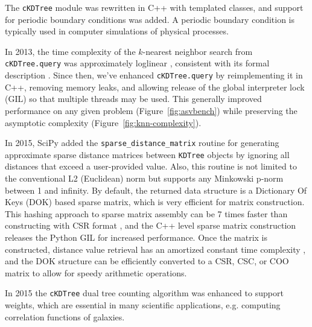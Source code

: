 The \texttt{cKDTree} module was rewritten in C++ with templated classes, and support for
periodic boundary conditions was added. A periodic boundary condition is typically 
used in computer simulations of physical processes.

In 2013, the time complexity of the $k$-nearest neighbor search from
\texttt{cKDTree.query} was approximately loglinear \cite{knn-jake},
consistent with its formal description \cite{kdtree-search-algo}.
Since then, we've enhanced \texttt{cKDTree.query} by reimplementing it in
C++, removing memory leaks, and allowing release of the global interpreter lock (GIL) so that
multiple threads may be used\cite{gh-4374}. This generally improved
performance on any given problem (Figure~\ref{fig:asvbench}) while
preserving the asymptotic complexity (Figure~\ref{fig:knn-complexity}).

In 2015, SciPy added the \texttt{sparse\_distance\_matrix} routine for generating 
approximate sparse distance matrices between \texttt{KDTree} objects by ignoring 
all distances that exceed a user-provided value. Also, this routine is not 
limited to the conventional L2 (Euclidean) norm but supports any Minkowski 
p-norm between 1 and infinity. By default, the returned data structure is a 
Dictionary Of Keys (DOK) based sparse matrix, which is very efficient for matrix 
construction. This hashing approach to sparse matrix assembly can be 7 times 
faster than constructing with CSR format
\cite{10.1007/978-3-540-75755-9_107}, and the C++ level sparse matrix construction 
releases the Python GIL for increased performance. Once the matrix is constructed, 
distance value retrieval has an amortized constant time complexity 
\cite{Cormen:2001:IA:580470}, and the DOK structure can be efficiently converted 
to a CSR, CSC, or COO matrix to allow for 
speedy arithmetic operations.

In 2015 the \texttt{cKDTree} dual tree counting algorithm\cite{Moore2000ar}
was enhanced to support weights\cite{ckdtree-weights}, which are
essential in many scientific applications, e.g. computing correlation
functions of galaxies\cite{0004-637X-750-1-38}.
